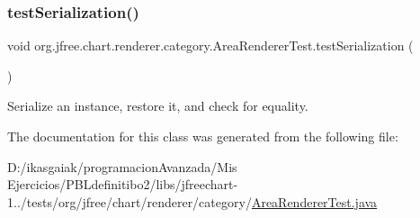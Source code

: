 \subsubsection{\texorpdfstring{test\+Serialization()}{testSerialization()}}
{\footnotesize\ttfamily void org.\+jfree.\+chart.\+renderer.\+category.\+Area\+Renderer\+Test.\+test\+Serialization (\begin{DoxyParamCaption}{ }\end{DoxyParamCaption})}

Serialize an instance, restore it, and check for equality. 

The documentation for this class was generated from the following file\+:\begin{DoxyCompactItemize}
\item 
D\+:/ikasgaiak/programacion\+Avanzada/\+Mis Ejercicios/\+P\+B\+Ldefinitibo2/libs/jfreechart-\/1../tests/org/jfree/chart/renderer/category/\mbox{\hyperlink{_area_renderer_test_8java}{Area\+Renderer\+Test.\+java}}\end{DoxyCompactItemize}
